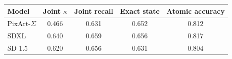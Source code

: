\begin{tabular}{@{}lcccc@{}}
\toprule
Model & Joint $\kappa$ & Joint recall & Exact state & Atomic accuracy \\
\midrule
PixArt-$\Sigma$ & 0.466 & 0.631 & 0.652 & 0.812 \\
SDXL & 0.640 & 0.659 & 0.656 & 0.817 \\
SD 1.5 & 0.620 & 0.656 & 0.631 & 0.804 \\
\bottomrule
\end{tabular}

